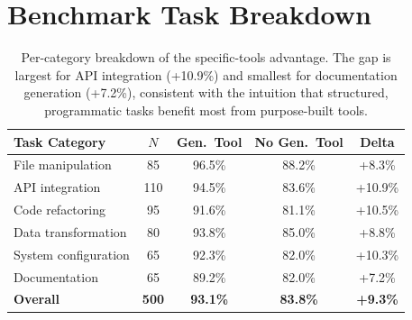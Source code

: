 \section{Benchmark Task Breakdown}

\label{app:benchmark}

\begin{table}[H]
\centering
\begin{tabular}{lcccc}
\toprule
Task Category & $N$ & Gen.\ Tool & No Gen.\ Tool & Delta \\
\midrule
File manipulation & 85 & 96.5\% & 88.2\% & +8.3\% \\
API integration & 110 & 94.5\% & 83.6\% & +10.9\% \\
Code refactoring & 95 & 91.6\% & 81.1\% & +10.5\% \\
Data transformation & 80 & 93.8\% & 85.0\% & +8.8\% \\
System configuration & 65 & 92.3\% & 82.0\% & +10.3\% \\
Documentation & 65 & 89.2\% & 82.0\% & +7.2\% \\
\midrule
\textbf{Overall} & \textbf{500} & \textbf{93.1\%} & \textbf{83.8\%} & \textbf{+9.3\%} \\
\bottomrule
\end{tabular}
\caption{Per-category breakdown of the specific-tools advantage.
The gap is largest for API integration (+10.9\%) and smallest for
documentation generation (+7.2\%), consistent with the intuition
that structured, programmatic tasks benefit most from purpose-built
tools.}
\label{tab:breakdown}
\end{table}

